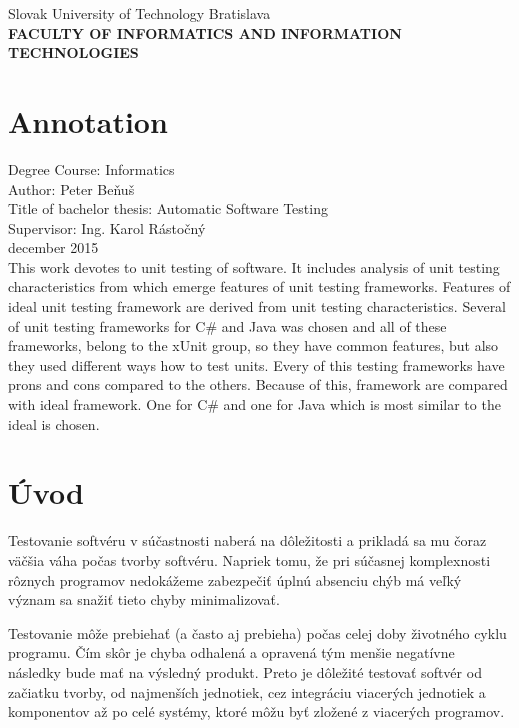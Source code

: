 \documentclass[11pt,twoside,slovak,a4paper]{article}
\begin{document}
	\begin{titlepage}
		\begin{center}
			\large 		Slovak University of Technology Bratislava\\
			\textbf{\MakeUppercase{Faculty of Informatics and Information Technologies}}\\
			\hrulefill
		\end{center}
		\section*{Annotation}
		Degree Course: Informatics\\
		Author: Peter Beňuš \\
		Title of bachelor thesis: Automatic Software Testing\\
		Supervisor: Ing. Karol Rástočný \\
		december 2015 \\
		This work devotes to unit testing of software. It includes analysis of unit testing characteristics from which emerge features of unit testing frameworks. Features of ideal unit testing framework are derived from unit testing characteristics. Several of unit testing frameworks for C\# and Java was chosen and  all of these frameworks, belong to the xUnit group, so they have common features, but also they used different ways how to test units. Every of this testing frameworks have prons and cons compared to the others. Because of this, framework are compared with ideal framework. One for C\# and one for Java which is most similar to the ideal is chosen.
		
		
	\end{titlepage}
	
	\begin{titlepage}
		\tableofcontents
	\end{titlepage}
	
	
	\pagestyle{fancy}
	\headheight 14pt
	
	\section{Úvod}
	Testovanie softvéru v súčastnosti naberá na dôležitosti a prikladá sa mu čoraz väčšia váha počas tvorby softvéru. Napriek tomu, že pri súčasnej komplexnosti rôznych programov nedokážeme zabezpečiť úplnú absenciu chýb má veľký význam sa snažiť tieto chyby minimalizovať.
	
	Testovanie môže prebiehať (a často aj prebieha) počas celej doby životného cyklu programu. Čím skôr je chyba odhalená a opravená tým menšie negatívne následky bude mať na výsledný produkt. Preto je dôležité testovať softvér od začiatku tvorby, od najmenších jednotiek, cez integráciu viacerých jednotiek a komponentov až po celé systémy, ktoré môžu byť zložené z viacerých programov.
	
\end{document}
